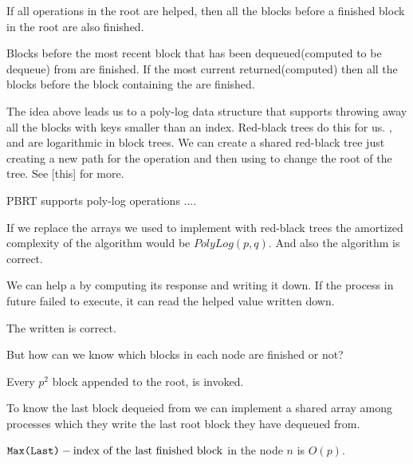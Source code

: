 \begin{lemma}
    If all  operations in the root are helped, then all the blocks before a finished block in the root are also finished.
\end{lemma}

\begin{lemma}
  Blocks before the most recent block that has been dequeued(computed to be dequeue) from are finished. If the most current  returned(computed)  then all the blocks before the block containing the  are finished.
\end{lemma}

The idea above leads us to a poly-log data structure that supports throwing away all the blocks with keys smaller than an index. Red-black trees do this for us. ,  and  are logarithmic in block trees.
We can create a shared red-black tree just creating a new path for the operation and then using  to change the root of the tree. See [this] for more.

\begin{observation}
PBRT supports poly-log operations ....
\end{observation}

\begin{lemma}
    If we replace the arrays we used to implement  with red-black trees the amortized complexity of the algorithm would be $PolyLog(p,q)$. And also the algorithm is correct.
\end{lemma}

We can help a  by computing its response and writing it down. If the process in future failed to execute, it can read the helped value written down.

\begin{lemma}
The  written is correct.
\end{lemma}

But how can we know which blocks in each node are finished or not? 

\begin{observation}
Every $p^2$ block appended to the root,  is invoked.  
\end{observation}

To know the last block dequeied from we can implement a shared array among processes which they write the last root block they have dequeued from. 

\begin{lemma}
    ${\normalfont{\texttt{Max(Last)}}} - \text{index of the last finished block}$ in the node $n$ is $O(p)$.
\end{lemma}

